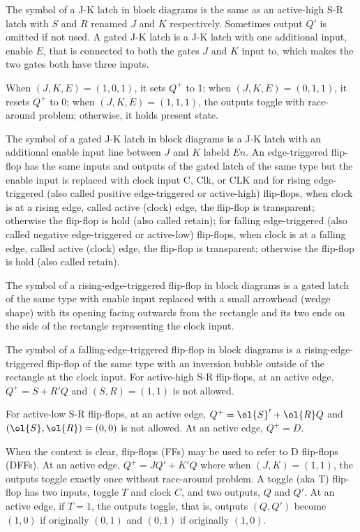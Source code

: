\documentclass[a4paper,12pt]{report}
\begin{document}
The symbol of a J-K latch in block diagrams is the same as an active-high S-R latch with $S$ and $R$ renamed $J$ and $K$ respectively. Sometimes output $Q'$ is omitted if not used.
A gated J-K latch is a J-K latch with one additional input, enable $E$, that is connected to both the gates $J$ and $K$ input to, which makes the two gates both have three inputs.

When $(J,K,E)=(1,0,1)$, it sets $Q^+$ to 1; when $(J,K,E)=(0,1,1)$, it resets $Q^+$ to 0; when $(J,K,E)=(1,1,1)$, the outputs toggle with race-around problem; otherwise, it holds present state.

The symbol of a gated J-K latch in block diagrams is a J-K latch with an additional enable input line between $J$ and $K$ labeld $En$.
An edge-triggered flip-flop has the same inputs and outputs of the gated latch of the same type but the enable input is replaced with clock input C, Clk, or CLK and for rising edge-triggered (also called positive edge-triggered or active-high) flip-flops, when clock is at a rising edge, called active (clock) edge, the flip-flop is transparent; otherwise the flip-flop is hold (also called retain); for falling edge-triggered (also called negative edge-triggered or active-low) flip-flops, when clock is at a falling edge, called active (clock) edge, the flip-flop is transparent; otherwise the flip-flop is hold (also called retain).

The symbol of a rising-edge-triggered flip-flop in block diagrams is a gated latch of the same type with enable input replaced with a small arrowhead (wedge shape) with its opening facing outwards from the rectangle and its two ends on the side of the rectangle representing the clock input.

The symbol of a falling-edge-triggered flip-flop in block diagrams is a rising-edge-triggered flip-flop of the same type with an inversion bubble outside of the rectangle at the clock input.
For active-high S-R flip-flops, at an active edge, $Q^+=S+R'Q$ and $(S,R)=(1,1)$ is not allowed.

For active-low S-R flip-flops, at an active edge, $Q^+=\ol{S}'+\ol{R}Q$ and $(\ol{S},\ol{R})=(0,0)$ is not allowed.
At an active edge, $Q^+=D$.

When the context is clear, flip-flops (FFs) may be used to refer to D flip-flops (DFFs).
At an active edge, $Q^+=JQ'+K'Q$ where when $(J,K)=(1,1)$, the outputs toggle exactly once without race-around problem.
A toggle (aka T) flip-flop has two inputs, toggle $T$ and clock $C$, and two outputs, $Q$ and $Q'$. At an active edge, if $T=1$, the outputs toggle, that is, outputs $(Q,Q')$ become $(1,0)$ if originally $(0,1)$ and $(0,1)$ if originally $(1,0)$.
\end{document}

